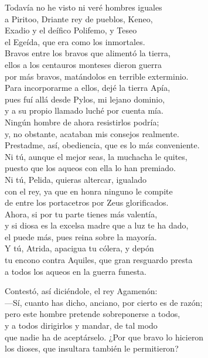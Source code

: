 Todavía no he visto ni veré hombres iguales\\
a Piritoo, Driante rey de pueblos, Keneo,\\
Exadio y el deífico Polifemo, y Teseo\\
el Egeída, que era como los inmortales.\\
Bravos entre los bravos que alimentó la tierra,\\
ellos a los centauros monteses dieron guerra\\
por más bravos, matándolos en terrible exterminio.\\
Para incorporarme a ellos, dejé la tierra Apía,\\
pues fuí allá desde Pylos, mi lejano dominio,\\
y a su propio llamado luché por cuenta mía.\\
Ningún hombre de ahora resistirlos podría;\\
y, no obstante, acataban mis consejos realmente.\\
Prestadme, así, obediencia, que es lo más conveniente.\\
Ni tú, aunque el mejor seas, la muchacha le quites,\\
puesto que los aqueos con ella lo han premiado.\\
Ni tú, Pelida, quieras altercar, igualado\\
con el rey, ya que en honra ninguno le compite\\
de entre los portacetros por Zeus glorificados.\\
Ahora, si por tu parte tienes más valentía,\\
y si diosa es la excelsa madre que a luz te ha dado,\\
el puede más, pues reina sobre la mayoría.\\
Y tú, Atrida, apacigua tu cólera, y depón\\
tu encono contra Aquiles, que gran resguardo presta\\
a todos los aqueos en la guerra funesta.\par
Contestó, así diciéndole, el rey Agamenón:\\
---Sí, cuanto has dicho, anciano, por cierto es de razón;\\
pero este hombre pretende sobreponerse a todos,\\
y a todos dirigirlos y mandar, de tal modo\\
que nadie ha de aceptárselo. ¿Por que bravo lo hicieron\\
los dioses, que insultara también le permitieron?\par
